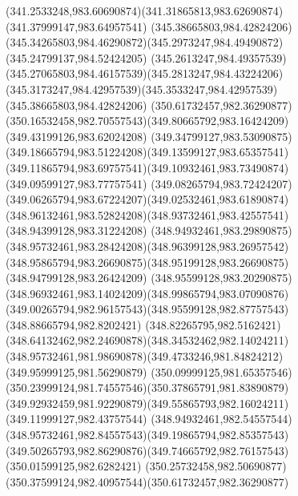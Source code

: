 {{\curveto(341.2533248,983.60690874)(341.31865813,983.62690874)(341.37999147,983.64957541)
\moveto(345.38665803,984.42824206)
\curveto(345.34265803,984.46290872)(345.2973247,984.49490872)(345.24799137,984.52424205)
\curveto(345.2613247,984.49357539)(345.27065803,984.46157539)(345.2813247,984.43224206)
\curveto(345.3173247,984.42957539)(345.3533247,984.42957539)(345.38665803,984.42824206)
\moveto(350.61732457,982.36290877)
\curveto(350.16532458,982.70557543)(349.80665792,983.16424209)(349.43199126,983.62024208)
\curveto(349.34799127,983.53090875)(349.18665794,983.51224208)(349.13599127,983.65357541)
\curveto(349.11865794,983.69757541)(349.10932461,983.73490874)(349.09599127,983.77757541)
\curveto(349.08265794,983.72424207)(349.06265794,983.67224207)(349.02532461,983.61890874)
\curveto(348.96132461,983.52824208)(348.93732461,983.42557541)(348.94399128,983.31224208)
\curveto(348.94932461,983.29890875)(348.95732461,983.28424208)(348.96399128,983.26957542)
\curveto(348.95865794,983.26690875)(348.95199128,983.26690875)(348.94799128,983.26424209)
\curveto(348.95599128,983.20290875)(348.96932461,983.14024209)(348.99865794,983.07090876)
\curveto(349.00265794,982.96157543)(348.95599128,982.87757543)(348.88665794,982.8202421)
\curveto(348.82265795,982.5162421)(348.64132462,982.24690878)(348.34532462,982.14024211)
\curveto(348.95732461,981.98690878)(349.4733246,981.84824212)(349.95999125,981.56290879)
\curveto(350.09999125,981.65357546)(350.23999124,981.74557546)(350.37865791,981.83890879)
\curveto(349.92932459,981.92290879)(349.55865793,982.16024211)(349.11999127,982.43757544)
\curveto(348.94932461,982.54557544)(348.95732461,982.84557543)(349.19865794,982.85357543)
\curveto(349.50265793,982.86290876)(349.74665792,982.76157543)(350.01599125,982.6282421)
\curveto(350.25732458,982.50690877)(350.37599124,982.40957544)(350.61732457,982.36290877)
}
}
